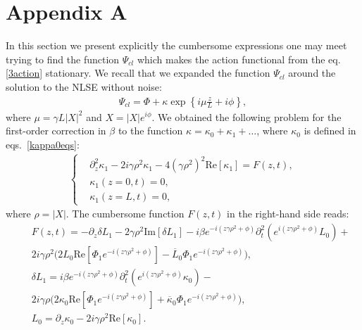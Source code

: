 \documentclass{article}
\begin{document}
\section{Appendix A}
In this section we present explicitly the cumbersome expressions one may meet trying to find the function $\Psi_{cl}$ which makes the action functional from the eq. \eqref{3action} stationary. We recall that we expanded the function $\Psi_{cl}$ around the solution to the NLSE without noise:
\begin{eqnarray}
    \Psi_{cl} = \Phi + \kappa \exp \left\{i \mu \frac{z}{L} + i\phi\right\}, 
\end{eqnarray}
where $\mu = \gamma L |X|^{2}$ and $X = |X|e^{i\phi}$. We obtained the following problem for the first-order correction in $\beta$ to the function $\kappa=\kappa_0+\kappa_1+\ldots$, where $\kappa_0$ is defined in eqs.~\eqref{kappa0eqs}:
\begin{eqnarray}\label{Aboundaryproblem}
\begin{cases}
        & \partial_{z}^{2}\kappa_{1} - 2i\gamma \rho^{2}\kappa_{1} - 4(\gamma \rho^{2})^{2}\textrm{Re}[\kappa_{1}] = F(z,t), \\
        &\kappa_{1}(z=0,t) = 0, \\
        &\kappa_{1}(z=L,t) = 0,
    \end{cases}
\end{eqnarray}
where $\rho = |X|$. The cumbersome function $F(z,t)$ in the right-hand side reads: 
\begin{eqnarray}\label{AfunctionF}
    &&F(z,t) = -\partial_{z}\delta L_{1} - 2\gamma\rho^{2}\textrm{Im}[\delta L_{1}] - i\beta e^{-i(z\gamma\rho^2+\phi)}\partial^2_{t}(e^{i(z\gamma\rho^2+\phi)}L_{0}) + \nonumber\\
    &&2i\gamma\rho^{2}\Big(2L_{0}\textrm{Re}[\Phi_{1}e^{-i(z\gamma\rho^2+\phi)}]-\overline{L}_{0}\Phi_{1}e^{-i(z\gamma\rho^2+\phi)}\Big),\nonumber\\
    &&\delta L_{1} = i\beta e^{-i(z\gamma\rho^2+\phi)}\partial^2_{t}(e^{i(z\gamma\rho^2+\phi)}\kappa_{0}) -\nonumber\\
    &&2i\gamma\rho\Big(2\kappa_{0}\textrm{Re}[\Phi_{1}e^{-i(z\gamma\rho^2+\phi)}] + \overline{\kappa}_{0}\Phi_{1}e^{-i(z\gamma\rho^2+\phi)}\Big),\nonumber\\
    &&L_{0} = \partial_{z}\kappa_{0} - 2i\gamma\rho^{2}\textrm{Re}[\kappa_{0}].
\end{eqnarray}
\end{document}
